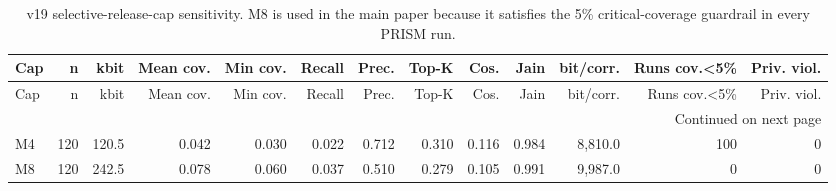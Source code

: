 
\scriptsize
\setlength{\tabcolsep}{3pt}
\renewcommand{\arraystretch}{1.08}
\begin{longtable}{lrrrrrrrrrrrr}
\caption{v19 selective-release-cap sensitivity. M8 is used in the main paper because it satisfies the 5\% critical-coverage guardrail in every PRISM run.}\label{tab:m4m8}\\
\toprule
Cap & n & kbit & Mean cov. & Min cov. & Recall & Prec. & Top-K & Cos. & Jain & bit/corr. & Runs cov.<5\% & Priv. viol. \\
\midrule
\endfirsthead
\toprule
Cap & n & kbit & Mean cov. & Min cov. & Recall & Prec. & Top-K & Cos. & Jain & bit/corr. & Runs cov.<5\% & Priv. viol. \\
\midrule
\endhead
\midrule
\multicolumn{13}{r}{Continued on next page} \\
\endfoot
\bottomrule
\endlastfoot
M4 & 120 & 120.5 & 0.042 & 0.030 & 0.022 & 0.712 & 0.310 & 0.116 & 0.984 & 8,810.0 & 100 & 0 \\
M8 & 120 & 242.5 & 0.078 & 0.060 & 0.037 & 0.510 & 0.279 & 0.105 & 0.991 & 9,987.0 & 0 & 0 \\
\end{longtable}
